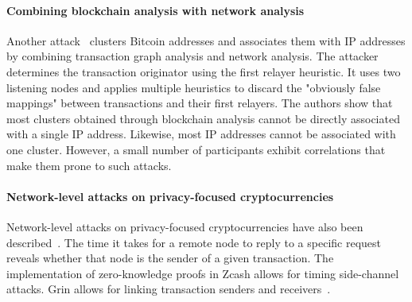 \paragraph{Combining blockchain analysis with network analysis}

Another attack~\cite{Neudecker2017} clusters Bitcoin addresses and associates them with IP addresses by combining transaction graph analysis and network analysis.
The attacker determines the transaction originator using the first relayer heuristic.
It uses two listening nodes and applies multiple heuristics to discard the "obviously false mappings" between transactions and their first relayers.
The authors show that most clusters obtained through blockchain analysis cannot be directly associated with a single IP address.
Likewise, most IP addresses cannot be associated with one cluster.
However, a small number of participants exhibit correlations that make them prone to such attacks.


\paragraph{Network-level attacks on privacy-focused cryptocurrencies}

Network-level attacks on privacy-focused cryptocurrencies have also been described~\cite{Tramer2020}.
The time it takes for a remote node to reply to a specific request reveals whether that node is the sender of a given transaction.
The implementation of zero-knowledge proofs in Zcash allows for timing side-channel attacks.
Grin allows for linking transaction senders and receivers~\cite{Bogatyy2019}.
